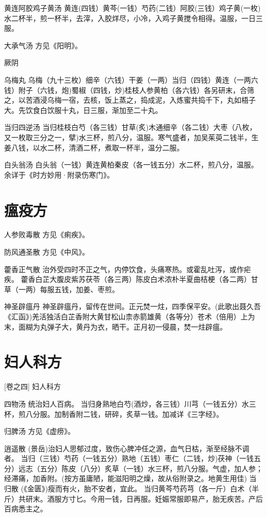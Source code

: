 \documentclass[a4paper,12pt,UTF8,twoside]{ctexbook}
\begin{document}
	黄连阿胶鸡子黄汤
	黄连(四钱）黄芩(一钱）芍药(二钱）阿胶(三钱）鸡子黄(一枚)水二杯半，煎一杯半，去滓，入胶烊尽，小冷，入鸡子黄搅令相得。温服，一日三服。
	
	大承气汤
	方见《阳明》。
	
	
	厥阴	
	
	乌梅丸
	乌梅（九十三枚）细辛（六钱）干姜（一两）当归（四钱）黄连（一两六钱）附子（六钱，炮)蜀椒（四钱，炒)桂枝人参黄柏（各六钱）各另研末，合筛之，以苦酒浸乌梅一宿，去核，饭上蒸之，捣成泥，入炼蜜共捣千下，丸如梧子大。先饮食白饮服十丸，日三服，渐加至二十丸。
	
	当归四逆汤
	当归桂枝白芍（各三钱）甘草(炙)木通细辛（各二钱）大枣（八枚，又一枚取三分之一，擘)水三杯，煎八分，温服。寒气盛者，加吴茱萸二钱半，生姜八钱，以水二杯，清酒二杯，煮取一杯半，温分二服。
	
	白头翁汤
	白头翁（一钱）黄连黄柏秦皮（各一钱五分）水二杯，煎八分，温服。余详于《时方妙用·附录伤寒门》。
	
	

	\chapter{瘟疫方}	
	
	人参败毒散
	方见《痢疾》。
	
	防风通圣散
	方见《中风》。
	
	藿香正气散
	治外受四时不正之气，内停饮食，头痛寒热。或霍乱吐泻，或作疟疾。
	藿香白芷大腹皮紫苏茯苓（各三两）陈皮白术浓朴半夏曲桔梗（各二两）甘草（一两）每服五钱，加姜、枣煎。
	
	神圣辟瘟丹
	神圣辟瘟丹，留传在世间。正元焚一炷，四季保平安。(此歌出聂久吾《汇函》)羌活独活白芷香附大黄甘松山柰赤箭雄黄（各等分）苍术（倍用）上为末，面糊为丸弹子大，黄丹为衣，晒干。正月初一侵晨，焚一炷辟瘟。
	
	

	\chapter{妇人科方}
		[卷之四] 妇人科方	
	
	四物汤
	统治妇人百病。
	当归身熟地白芍(酒炒，各三钱）川芎（一钱五分）水三杯，煎八分服。加制香附二钱，研碎，炙草一钱。加减详《三字经》。
	
	归脾汤
	方见《虚痨》。
	
	逍遥散
	(景岳)治妇人思郁过度，致伤心脾冲任之源，血气日枯，渐至经脉不调者。
	当归（三钱）芍药（一钱五分）熟地（五钱）枣仁（二钱，炒)茯神（一钱五分）远志（五分）陈皮（八分）炙草（一钱）水三杯，煎八分服。气虚，加人参；经滞痛，加香附。(按方虽庸陋，能滋阳明之燥，故从俗附录之。地黄生用佳)
	当归散
	(《金匮》)瘦而有火，胎不安者，宜此。
	当归黄芩芍药芎（各一斤）白术（半斤）共研末。酒服方寸匕。今用一钱，日再服。妊娠常服即易产，胎无疾苦。产后百病悉主之。
	
\end{document}
